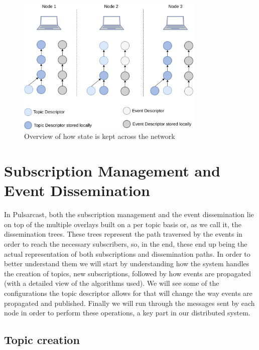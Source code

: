 \begin{figure}[hb!]
  \centering
  \includegraphics[width=0.8\textwidth]{img/pulsarcast-local-vs-distributed-state.png}
  \caption{Overview of how state is kept across the network}
  \label{fig:pulsarcast-local-vs-distributed-state}
\end{figure}

\section{Subscription Management and Event Dissemination}\label{subscription-management-event-dissemination}

In Pulsarcast, both the subscription management and the event dissemination lie
on top of the multiple overlays built on a per topic basis or, as we call it,
the dissemination trees. These trees represent the path traversed by the events
in order to reach the necessary subscribers, so, in the end, these end up being
the actual representation of both subscriptions and dissemination paths. In
order to better understand them we will start by understanding how the system
handles the creation of topics, new subscriptions, followed by how events are
propagated (with a detailed view of the algorithms used). We will see some of
the configurations the topic descriptor allows for that will change the way
events are propagated and published. Finally we will run through the messages
sent by each node in order to perform these operations, a key part in our
distributed system.

\subsection{Topic creation}\label{subsec:topic-creation}

